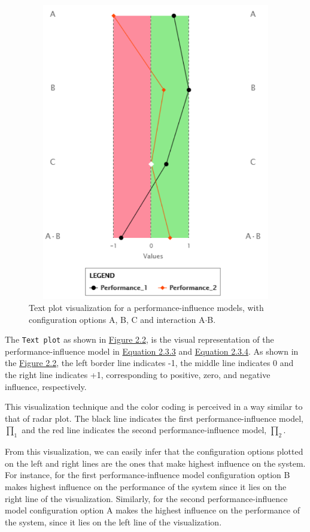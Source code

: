 \begin{figure}[ht]
\centering
\label{textPlot}
\includegraphics[width=12cm,height=13cm,keepaspectratio,]{pics/text_plot.pdf}
\caption[Text Plot]{Text plot visualization for a performance-influence models, with configuration options A, B, C and interaction A$\cdot$B.}
\end{figure}

The \texttt{Text plot} as shown in \hyperref[textPlot]{Figure 2.2}, is the visual representation of the performance-influence model in \hyperref[eq:2.3.3]{Equation 2.3.3} and \hyperref[eq:2.3.4]{Equation 2.3.4}. As shown in the \hyperref[textPlot]{Figure 2.2}, the left border line indicates -1, the middle line indicates 0 and the right line indicates +1, corresponding to positive, zero, and negative influence, respectively. 

This visualization technique and the color coding is perceived in a way similar to that of radar plot. The black line indicates the first performance-influence model, $\prod_1$ and the red line indicates the second performance-influence model, $\prod_2$. 

From this visualization, we can easily infer that the configuration options plotted on the left and right lines are the ones that make highest influence on the system. For instance, for the first performance-influence model configuration option B makes highest influence on the performance of the system since it lies on the right line of the visualization. Similarly, for the second performance-influence model configuration option A makes the highest influence on the performance of the system, since it lies on the left line of the visualization.

